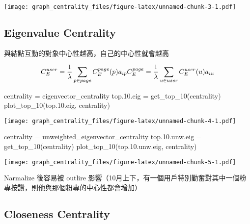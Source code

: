 \documentclass[
]{article}
\newenvironment{Shaded}{\begin{snugshade}}{\end{snugshade}}
\newcommand{\FloatTok}[1]{\textcolor[rgb]{0.00,0.00,0.81}{#1}}
\newcommand{\FunctionTok}[1]{\textcolor[rgb]{0.00,0.00,0.00}{#1}}
\newcommand{\NormalTok}[1]{#1}
\newcommand{\OtherTok}[1]{\textcolor[rgb]{0.56,0.35,0.01}{#1}}
\newcommand{\StringTok}[1]{\textcolor[rgb]{0.31,0.60,0.02}{#1}}
\begin{document}
\texttt{[image: graph\_centrality\_files/figure-latex/unnamed-chunk-3-1.pdf]}

\hypertarget{eigenvalue-centrality}{%
\subsection{Eigenvalue Centrality}\label{eigenvalue-centrality}}

與結點互動的對象中心性越高，自己的中心性就會越高

\[
C_E^{user} =  \frac{1}{\lambda} \sum_{p \in page} C_E^{page}(p) a_{ip} \\
C_E^{page} =  \frac{1}{\lambda} \sum_{u \in user} C_E^{user}(u) a_{iu}
\]

\begin{Shaded}
\begin{Highlighting}[]
\NormalTok{centrality }\OtherTok{=} \StringTok{\textquotesingle{}eigenvector\_centrality\textquotesingle{}}
\NormalTok{top.}\FloatTok{10.}\NormalTok{eig }\OtherTok{=} \FunctionTok{get\_top\_10}\NormalTok{(centrality)}
\FunctionTok{plot\_top\_10}\NormalTok{(top.}\FloatTok{10.}\NormalTok{eig, centrality)}
\end{Highlighting}
\end{Shaded}

\texttt{[image: graph\_centrality\_files/figure-latex/unnamed-chunk-4-1.pdf]}

\begin{Shaded}
\begin{Highlighting}[]
\NormalTok{centrality }\OtherTok{=} \StringTok{\textquotesingle{}unweighted\_eigenvector\_centrality\textquotesingle{}}
\NormalTok{top.}\FloatTok{10.}\NormalTok{unw.eig }\OtherTok{=} \FunctionTok{get\_top\_10}\NormalTok{(centrality)}
\FunctionTok{plot\_top\_10}\NormalTok{(top.}\FloatTok{10.}\NormalTok{unw.eig, centrality)}
\end{Highlighting}
\end{Shaded}

\texttt{[image: graph\_centrality\_files/figure-latex/unnamed-chunk-5-1.pdf]}

Narmalize 後容易被 outlire
影響（10月上下，有一個用戶特別勤奮對其中一個粉專按讚，則他與那個粉專的中心性都會增加）

\hypertarget{closeness-centrality}{%
\subsection{Closeness Centrality}\label{closeness-centrality}}
\end{document}
